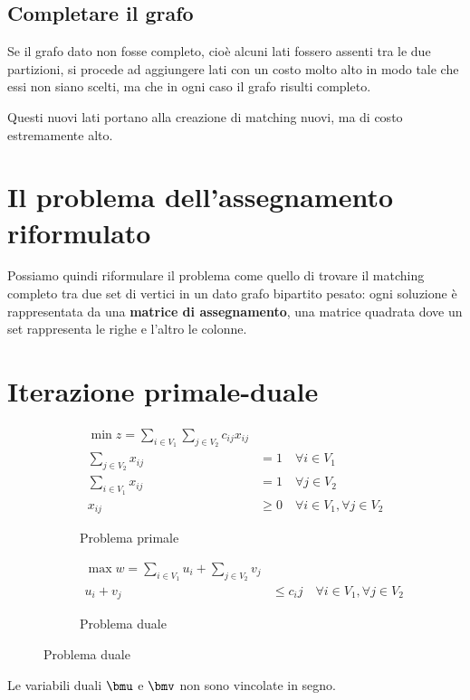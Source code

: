 \documentclass[\main/main.tex]{subfiles}
\begin{document}
\subsection{Completare il grafo}
Se il grafo dato non fosse completo, cioè alcuni lati fossero assenti tra le due partizioni, si procede ad aggiungere lati con un costo molto alto in modo tale che essi non siano scelti, ma che in ogni caso il grafo risulti completo.

Questi nuovi lati portano alla creazione di matching nuovi, ma di costo estremamente alto.

\section{Il problema dell'assegnamento riformulato}
Possiamo quindi riformulare il problema come quello di trovare il matching completo tra due set di vertici in un dato grafo bipartito pesato: ogni soluzione è rappresentata da una \textbf{matrice di assegnamento}, una matrice quadrata dove un set rappresenta le righe e l'altro le colonne.

\section{Iterazione primale-duale}
\begin{figure}
	\begin{subfigure}{0.49\textwidth}
		\begin{align*}
			\min z = \sum_{i \in V_1} \sum_{j \in V_2} c_{ij}x_{ij}                    \\
			\sum_{j \in V_2}x_{ij} & = 1 \quad \forall i \in V_1                       \\
			\sum_{i \in V_1}x_{ij} & = 1 \quad \forall j \in V_2                       \\
			x_{ij}                 & \geq 0 \quad \forall i \in V_1, \forall j \in V_2
		\end{align*}
		\caption{Problema primale}
	\end{subfigure}
	\begin{subfigure}{0.49\textwidth}
		\begin{align*}
			\max w = \sum_{i\in V_1} u_i + \sum_{j \in V_2} v_j             \\
			u_i + v_j & \leq c_ij\quad \forall i \in V_1, \forall j \in V_2
		\end{align*}
		\caption{Problema duale}
	\end{subfigure}
\end{figure}
Le variabili duali \(\bmu \) e \(\bmv \) non sono vincolate in segno.
\end{document}
